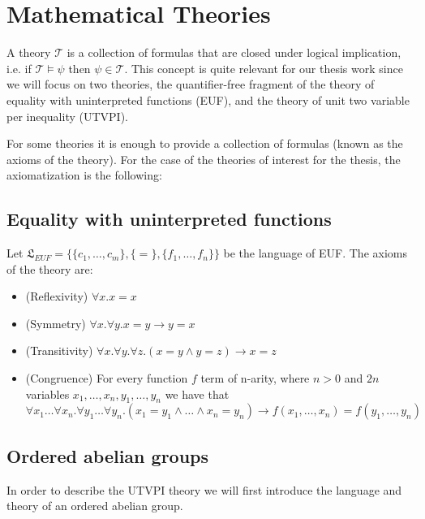 \section{Mathematical Theories} \label{math_theories}

A theory $\mathcal{T}$ is a collection of formulas that are closed under logical implication, i.e. if $\mathcal{T} \models \psi$ then $\psi \in \mathcal{T}$. This concept is quite relevant for our thesis work since we will focus on two theories, the quantifier-free fragment of the theory of equality with uninterpreted functions (EUF), and the theory of unit two variable per inequality (UTVPI). 

For some theories it is enough to provide a collection of formulas (known as the axioms of the theory). For the case of the theories of interest for the thesis, the axiomatization is the following:

\subsection{Equality with uninterpreted functions}

\begin{definition} \label{euf_axioms}
  Let $\mathfrak{L}_{EUF} = \{ \{c_1, \dots, c_m \}, \{ = \}, \{ f_1, \dots, f_n \} \}$ be the language of EUF. The axioms of the theory are:
  \begin{itemize}
    \item (Reflexivity) $\forall x . x = x$
    \item (Symmetry) $\forall x . \forall y . x = y \rightarrow y = x$
    \item (Transitivity) $\forall x . \forall y . \forall z. (x = y \land y = z) \rightarrow x = z$
    \item (Congruence) For every function $f$ term of n-arity, 
      where $n > 0$ and $2n$ variables $x_1, \dots, x_n, 
      y_1, \dots, y_n$ 
      we have that
      $\forall x_1  \dots \forall x_n . \forall y_1 \dots \forall y_n . (x_1 = y_1 \land \dots \land x_n = y_n) \rightarrow f(x_1, \dots, x_n) = f(y_1, \dots, y_n)$
  \end{itemize}
\end{definition}

\subsection{Ordered abelian groups}

In order to describe the UTVPI theory we will first 
introduce the language and theory of an ordered abelian group.

